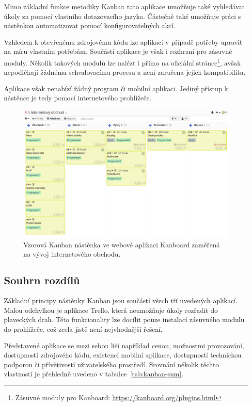 Mimo základní funkce metodiky Kanban tato aplikace umožňuje také vyhledávat úkoly za pomocí vlastního dotazovacího jazyka. Částečně také umožňuje práci s nástěnkou automatizovat pomocí konfigurovatelných akcí.

Vzhledem k otevřenému zdrojovému kódu lze aplikaci v případě potřeby upravit na míru vlastním potřebám. Součástí aplikace je však i rozhraní pro zásuvné moduly. Několik takových modulů lze nalézt i přímo na oficiální stránce\footnote{Zásuvné moduly pro Kanboard: \url{https://kanboard.org/plugins.html}}, avšak nepodléhají žádnému schvalovacímu procesu a není zaručena jejich kompatibilita.

Aplikace však nenabízí žádný program či mobilní aplikaci. Jediný přístup k nástěnce je tedy pomocí internetového prohlížeče.

\begin{figure}[H]
	\centering
	\includegraphics[width=\textwidth]{obrazky-figures/kanboard.png}
	\caption{Vzorová Kanban nástěnka ve webové aplikaci Kanboard zaměřená na vývoj internetového obchodu.}
\end{figure}

\subsection{Souhrn rozdílů}

Základní principy nástěnky Kanban jsou součástí všech tří uvedených aplikací. Malou odchylkou je aplikace Trello, která neumožňuje úkoly rozřadit do plaveckých drah. Této funkcionality lze docílit pouze instalací zásuvného modulu do prohlížeče, což zcela jistě není nejvhodnější řešení.

Představené aplikace se mezi sebou liší například cenou, možnostmi provozování, dostupností zdrojového kódu, existencí mobilní aplikace, dostupností technickou podporou či přívětivostí uživatelského prostředí. Srovnání několik těchto vlastností je přehledně uvedeno v tabulce~\ref{tab:kanban-sum}. 

